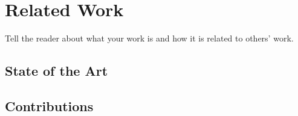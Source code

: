 
\chapter{Related Work}
\label{chapter:related-work}

Tell the reader about what your work is and how it is related to others' work.

\section{State of the Art}
\label{sec:state-of-the-art}

\section{Contributions}
\label{sec:contributions}
